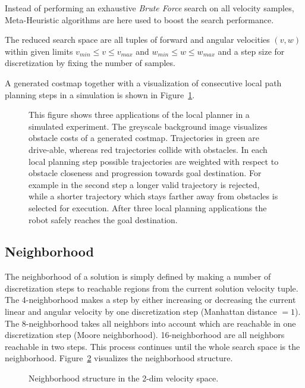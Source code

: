 Instead of performing an exhaustive \textit{Brute Force} search on all velocity samples, Meta-Heuristic algorithms are here used to boost the search performance. 

The reduced search space are all tuples of forward and angular velocities $(v,w)$ within given limits $v_{min} \leq v \leq v_{max}$ and $w_{min} \leq w \leq w_{max}$ and a step size for discretization by fixing the number of samples.

A generated costmap together with a visualization of consecutive local path planning steps in a simulation is shown in Figure~\ref{fig:fig_instances_detail}.
   
\begin{figure}[thpb]
     \footnotesize
      \centering
      \setlength\fboxsep{0pt}
      \setlength\fboxrule{0.5pt}
       \def\svgwidth{\textwidth}
       
		\caption[Local-path planning simulation.]{This figure shows three applications of the local planner in a simulated experiment. The greyscale background image visualizes obstacle costs of a generated costmap. Trajectories in green are drive-able, whereas red trajectories collide with obstacles. In each local planning step possible trajectories are weighted with respect to obstacle closeness and progression towards goal destination. For example in the second step a longer valid trajectory is rejected, while a shorter trajectory which stays farther away from obstacles is selected for execution. After three local planning applications the robot safely reaches the goal destination.}
		\label{fig:fig_instances_detail}
\end{figure}

\subsection{Neighborhood}
The neighborhood of a solution is simply defined by making a number of discretization steps to reachable regions from the current solution velocity tuple. 
The 4-neighborhood makes a step by either increasing or decreasing the current linear and angular velocity by one discretization step (Manhattan distance $=1$). 
The 8-neighborhood takes all neighbors into account which are reachable in one discretization step (Moore neighborhood). 
16-neighborhood are all neighbors reachable in two steps. 
This process continues until the whole search space is the neighborhood. Figure~\ref{fig:fig_nb} visualizes the neighborhood structure.
\begin{figure}[thpb]
   \footnotesize
   \centering
   \def\svgwidth{\textwidth}
        
   \caption[]{Neighborhood structure in the 2-dim velocity space.}
   \label{fig:fig_nb}
\end{figure}

